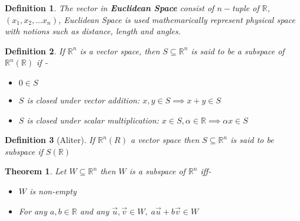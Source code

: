 \documentclass[12pt]{article}
\newcommand{\R}{\mathbb{R}}
\newtheorem{thm}{Theorem}
\newtheorem*{defn}{Definition}
\begin{document}
\begin{defn}\normalfont
	The vector in \textbf{Euclidean Space} consist of $n-$tuple of $\R$, $(x_1,x_2,\dots x_n)$, Euclidean Space is used mathemarically represent physical space with notions such as distance, length and angles.
\end{defn}

\begin{defn} \normalfont
	If $\R^n$ is a vector space, then $S \subseteq \R^n$ is said to be a subspace of $\R^n (\R)$ if - 
	\begin{itemize}
		\item $0 \in S$
		\item $S$ is closed under vector addition: $x,y \in S \implies x+y \in S$
		\item $S$ is closed under scalar multiplication: $x \in S, \alpha \in \R \implies \alpha x \in S$
	\end{itemize}
\end{defn}

\begin{defn}[Aliter]\normalfont
	If $\R^n(R)$ a vector space then $S \subseteq \R^n$ is said to be subspace if $S(\R)$
\end{defn}

\begin{thm}\normalfont
	Let $W \subseteq \R^n$ then $W$ is a subspace of $\R^n$ iff-
	\begin{itemize}
		\item $W$ is non-empty
		\item For any $a,b \in \R $ and any $\vec{u}, \vec{v} \in W,\; a\vec{u}+b\vec{v} \in W$
	\end{itemize}
\end{thm}
\end{document}
